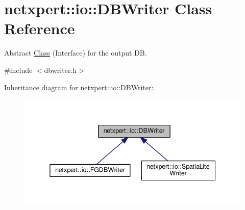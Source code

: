 \hypertarget{classnetxpert_1_1io_1_1DBWriter}{}\section{netxpert\+:\+:io\+:\+:D\+B\+Writer Class Reference}
\label{classnetxpert_1_1io_1_1DBWriter}


Abstract \hyperlink{classClass}{Class} (Interface) for the output DB.  




{\ttfamily \#include $<$dbwriter.\+h$>$}



Inheritance diagram for netxpert\+:\+:io\+:\+:D\+B\+Writer\+:\nopagebreak
\begin{figure}[H]
\begin{center}
\leavevmode
\includegraphics[width=338pt]{classnetxpert_1_1io_1_1DBWriter__inherit__graph}
\end{center}
\end{figure}
